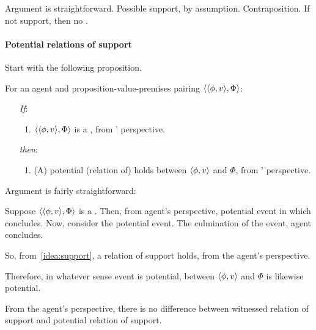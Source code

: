 \begin{note}[Argument]
  Argument is straightforward.
  Possible support, by assumption.
  Contraposition.
  If not support, then no \fc{}.
\end{note}

\paragraph{Potential relations of support}

\begin{note}
  Start with the following proposition.
  \begin{proposition}
    \label{prop:fcs-only-if-pot-support}
    For an agent \vAgent{} and proposition-value-premises pairing \(\langle \langle \phi, v \rangle, \Phi \rangle\):
    \begin{enumerate}
    \item[\emph{If}:]
      \begin{enumerate}[label=\alph*., ref=(\alph*.)]
      \item
        \(\langle \langle \phi, v \rangle, \Phi \rangle\) is a , from \vAgent{}' perspective.
      \end{enumerate}
    \item[\emph{then}:]
      \begin{enumerate}[label=\alph*., ref=(\alph*.), resume]
      \item
        (A) potential (relation of) \support{} holds between \(\langle \phi, v \rangle\) and \(\Phi\), from \vAgent{}' perspective.
      \end{enumerate}
    \end{enumerate}
    \vspace{-\baselineskip}
  \end{proposition}

  Argument is fairly straightforward:
  \begin{argument}
    Suppose \(\langle \langle \phi, v \rangle, \Phi \rangle\) is a .
    Then, from agent's perspective, potential event in which concludes.
    Now, consider the potential event.
    The culmination of the event, agent concludes.

    So, from~\autoref{idea:support}, a relation of support holds, from the agent's perspective.

    Therefore, in whatever sense event is potential, \support{} between \(\langle \phi, v \rangle\) and \(\Phi\) is likewise potential.
  \end{argument}
  From the agent's perspective, there is no difference between witnessed relation of support and potential relation of support.
\end{note}

